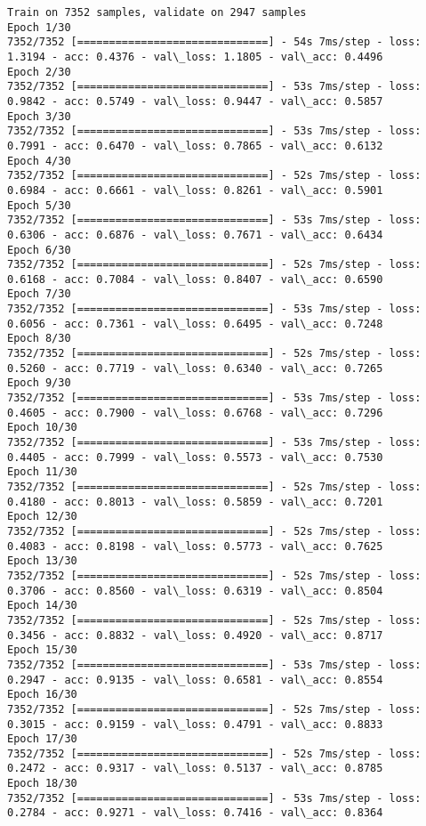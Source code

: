 \documentclass[11pt]{article}
\begin{document}
    \begin{Verbatim}[commandchars=\\\{\}]
Train on 7352 samples, validate on 2947 samples
Epoch 1/30
7352/7352 [==============================] - 54s 7ms/step - loss: 1.3194 - acc: 0.4376 - val\_loss: 1.1805 - val\_acc: 0.4496
Epoch 2/30
7352/7352 [==============================] - 53s 7ms/step - loss: 0.9842 - acc: 0.5749 - val\_loss: 0.9447 - val\_acc: 0.5857
Epoch 3/30
7352/7352 [==============================] - 53s 7ms/step - loss: 0.7991 - acc: 0.6470 - val\_loss: 0.7865 - val\_acc: 0.6132
Epoch 4/30
7352/7352 [==============================] - 52s 7ms/step - loss: 0.6984 - acc: 0.6661 - val\_loss: 0.8261 - val\_acc: 0.5901
Epoch 5/30
7352/7352 [==============================] - 53s 7ms/step - loss: 0.6306 - acc: 0.6876 - val\_loss: 0.7671 - val\_acc: 0.6434
Epoch 6/30
7352/7352 [==============================] - 52s 7ms/step - loss: 0.6168 - acc: 0.7084 - val\_loss: 0.8407 - val\_acc: 0.6590
Epoch 7/30
7352/7352 [==============================] - 53s 7ms/step - loss: 0.6056 - acc: 0.7361 - val\_loss: 0.6495 - val\_acc: 0.7248
Epoch 8/30
7352/7352 [==============================] - 52s 7ms/step - loss: 0.5260 - acc: 0.7719 - val\_loss: 0.6340 - val\_acc: 0.7265
Epoch 9/30
7352/7352 [==============================] - 53s 7ms/step - loss: 0.4605 - acc: 0.7900 - val\_loss: 0.6768 - val\_acc: 0.7296
Epoch 10/30
7352/7352 [==============================] - 53s 7ms/step - loss: 0.4405 - acc: 0.7999 - val\_loss: 0.5573 - val\_acc: 0.7530
Epoch 11/30
7352/7352 [==============================] - 52s 7ms/step - loss: 0.4180 - acc: 0.8013 - val\_loss: 0.5859 - val\_acc: 0.7201
Epoch 12/30
7352/7352 [==============================] - 52s 7ms/step - loss: 0.4083 - acc: 0.8198 - val\_loss: 0.5773 - val\_acc: 0.7625
Epoch 13/30
7352/7352 [==============================] - 52s 7ms/step - loss: 0.3706 - acc: 0.8560 - val\_loss: 0.6319 - val\_acc: 0.8504
Epoch 14/30
7352/7352 [==============================] - 52s 7ms/step - loss: 0.3456 - acc: 0.8832 - val\_loss: 0.4920 - val\_acc: 0.8717
Epoch 15/30
7352/7352 [==============================] - 53s 7ms/step - loss: 0.2947 - acc: 0.9135 - val\_loss: 0.6581 - val\_acc: 0.8554
Epoch 16/30
7352/7352 [==============================] - 52s 7ms/step - loss: 0.3015 - acc: 0.9159 - val\_loss: 0.4791 - val\_acc: 0.8833
Epoch 17/30
7352/7352 [==============================] - 52s 7ms/step - loss: 0.2472 - acc: 0.9317 - val\_loss: 0.5137 - val\_acc: 0.8785
Epoch 18/30
7352/7352 [==============================] - 53s 7ms/step - loss: 0.2784 - acc: 0.9271 - val\_loss: 0.7416 - val\_acc: 0.8364

\end{Verbatim}
\end{document}

